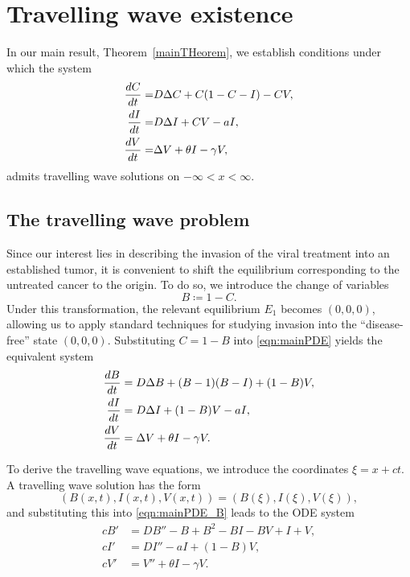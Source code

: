 \documentclass[11pt]{article}
\theoremstyle{definition}
\begin{document}
\section{Travelling wave existence}
In our main result, Theorem~\ref{mainTHeorem}, we establish conditions under which the system
\begin{align}
\label{eqn:mainPDE}
\notag
\frac{dC}{dt}=& D \Delta C + C(1 - C - I) - C V,\\
\frac{dI}{dt} =& D \Delta I + C V - a I,\\
\notag
\frac{dV}{dt} =& \Delta V + \theta I - \gamma V,
\end{align}
admits travelling wave solutions on $-\infty<x<\infty$.   

\subsection{The travelling wave problem}
Since our interest lies in describing the invasion of the viral treatment into an established tumor, it is convenient to shift the equilibrium corresponding to the untreated cancer to the origin. To do so, we introduce the change of variables
\[
B \coloneqq 1 - C.
\]
Under this transformation, the relevant equilibrium $E_1$ becomes $(0,0,0)$, allowing us to apply standard techniques for studying invasion into the ``disease-free'' state $(0,0,0)$. Substituting $C = 1 - B$ into \eqref{eqn:mainPDE} yields the equivalent system
\begin{align}
\label{eqn:mainPDE_B}
\notag
\frac{dB}{dt} &= D \Delta B + (B-1)(B-I) + (1-B)V,\\
\frac{dI}{dt} &= D \Delta I + (1-B)V - a I,\\
\notag
\frac{dV}{dt} &= \Delta V + \theta I - \gamma V.
\end{align}

To derive the travelling wave equations, we introduce the coordinates $\xi = x + ct$. A travelling wave solution has the form
\[
(B(x,t), I(x,t), V(x,t)) = (B(\xi), I(\xi), V(\xi)),
\]
and substituting this into \eqref{eqn:mainPDE_B} leads to the ODE system
\begin{align}
\label{ODE_B}
c B' &= D B'' - B + B^2 - B I - B V + I + V, \nonumber\\
c I' &= D I'' - a I + (1-B)V,\\
c V' &= V'' + \theta I - \gamma V. \nonumber
\end{align}
\end{document}
